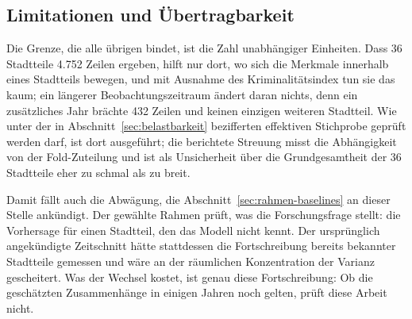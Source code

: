 \documentclass[12pt,a4paper]{article}
\begin{document}
%

\subsection{Limitationen und Übertragbarkeit}
\label{sec:limitationen}

Die Grenze, die alle übrigen bindet, ist die Zahl unabhängiger Einheiten. Dass
36 Stadtteile 4.752 Zeilen ergeben, hilft nur dort, wo sich die Merkmale
innerhalb eines Stadtteils bewegen, und mit Ausnahme des Kriminalitätsindex tun
sie das kaum; ein längerer Beobachtungszeitraum ändert daran nichts, denn ein
zusätzliches Jahr brächte 432 Zeilen und keinen einzigen weiteren Stadtteil. Wie
unter der in Abschnitt~\ref{sec:belastbarkeit} bezifferten effektiven Stichprobe
geprüft werden darf, ist dort ausgeführt; die berichtete Streuung misst die
Abhängigkeit von der Fold-Zuteilung und ist als Unsicherheit über die
Grundgesamtheit der 36 Stadtteile eher zu schmal als zu breit.

Damit fällt auch die Abwägung, die Abschnitt~\ref{sec:rahmen-baselines} an dieser Stelle ankündigt. Der gewählte Rahmen prüft, was die Forschungsfrage stellt: die Vorhersage für einen Stadtteil, den das Modell nicht kennt. Der ursprünglich angekündigte Zeitschnitt hätte stattdessen die Fortschreibung bereits bekannter Stadtteile gemessen und wäre an der räumlichen Konzentration der Varianz gescheitert. Was der Wechsel kostet, ist genau diese Fortschreibung: Ob die geschätzten Zusammenhänge in einigen Jahren noch gelten, prüft diese Arbeit nicht.
\end{document}
